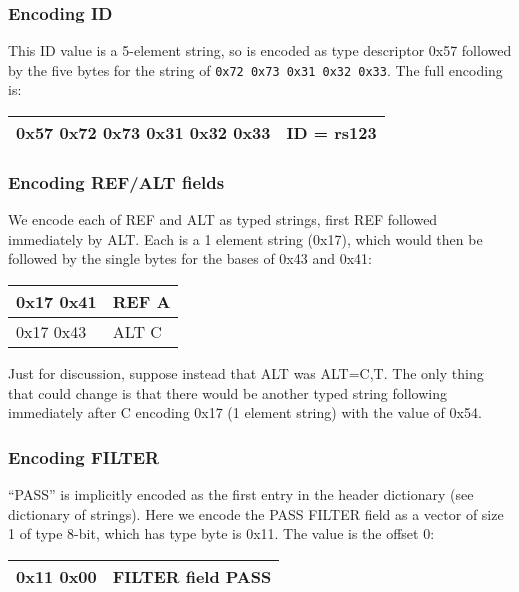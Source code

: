 \documentclass[8pt]{article}
\begin{document}
\subsubsection{Encoding ID}

This ID value is a 5-element string, so is encoded as type descriptor 0x57 followed by the five bytes for the string of {\tt 0x72 0x73 0x31 0x32 0x33}.
The full encoding is:

\vspace{0.3cm}
\begin{tabular}{|l| l|} \hline
0x57 0x72 0x73 0x31 0x32 0x33 & ID = rs123 \\ \hline
\end{tabular}

\subsubsection{Encoding REF/ALT fields}

We encode each of REF and ALT as typed strings, first REF followed immediately by ALT.
Each is a 1 element string (0x17), which would then be followed by the single bytes for the bases of 0x43 and 0x41:

\vspace{0.3cm}
\begin{tabular}{|l| l|} \hline
0x17 0x41 & REF A \\ \hline
0x17 0x43 & ALT C \\ \hline
\end{tabular}

\vspace{0.3cm}
Just for discussion, suppose instead that ALT was ALT=C,T.
The only thing that could change is that there would be another typed string following immediately after C encoding 0x17 (1 element string) with the value of 0x54.

\subsubsection{Encoding FILTER}

``PASS'' is implicitly encoded as the first entry in the header dictionary (see dictionary of strings).
Here we encode the PASS FILTER field as a vector of size 1 of type 8-bit, which has type byte is 0x11.
The value is the offset 0:

\vspace{0.3cm}
\begin{tabular}{|l| l|} \hline
0x11 0x00 & FILTER field PASS \\ \hline
\end{tabular}
\end{document}
